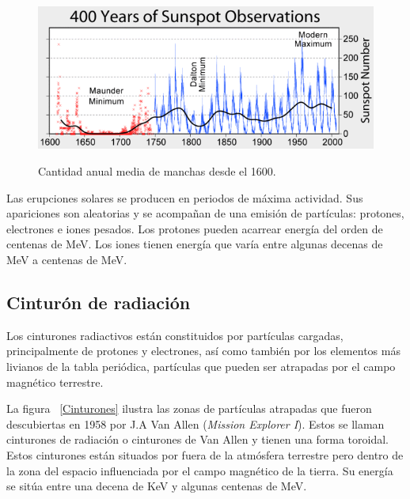 \documentclass[a4paper,openright,12pt]{report}
\begin{document}
\begin{figure}[H]
	\centering
	\includegraphics[width=0.80 \textwidth]{img/sunspot_numbers-copie.png}
	\caption{Cantidad anual media de manchas desde el  1600. }\cite{NASA2}
	\label{maunder}
\end{figure}


Las erupciones solares se producen en periodos de máxima actividad. Sus apariciones son aleatorias y se acompañan de una emisión de partículas:  protones,  electrones e  iones pesados. Los protones pueden acarrear energía del orden de centenas de MeV. Los iones tienen energía que varía entre algunas decenas de MeV a centenas de MeV.
\pagebreak
\subsection{Cinturón de radiación }

Los cinturones radiactivos están constituidos por partículas cargadas, principalmente de protones y  electrones, así como también por los  elementos más livianos de la tabla periódica, partículas que pueden ser atrapadas por el campo magnético terrestre. 

La figura ~\ref{Cinturones} ilustra las zonas de partículas atrapadas que fueron descubiertas en 1958 por J.A Van Allen (\textit{Mission Explorer I}). Estos se llaman cinturones de radiación o cinturones de Van Allen y tienen una forma toroidal. Estos cinturones están situados por fuera de la atmósfera terrestre pero dentro de la zona del espacio influenciada por el campo magnético de la tierra. Su energía se sitúa entre una decena de KeV y algunas centenas de MeV.
\end{document}
